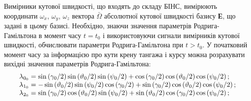 Вимірники кутової швидкості, що входять до складу БІНС, вимірюють координати 
$\omega_{x}$, $\omega_{y}$, $\omega_{z}$ вектора $\bar{\Omega }$ абсолютної кутової швидкості 
базису \textbf{Е}, що задані в цьому базисі. Необхідно, знаючи значення параметрів 
Родрига-Гамільтона в момент часу $t=t_{0} $ і використовуючи сигнали вимірників кутової 
швидкості, обчислювати параметри Родрига-Гамільтона при $t>t_{0} $. У початковий 
момент часу за інформацією про кути крену тангажа і курсу можна розрахувати вихідні 
значення параметрів Родрига-Гамільтона: 
\[\begin{array}{l} 
{\lambda_{0_{0}} =\sin  \left({\gamma_{0}  \mathord{
\left/{\vphantom{\gamma_{0}  2}}\right.\kern-\nulldelimiterspace} 2} \right)\sin 
 \left({\vartheta_{0}  \mathord{\left/{\vphantom{\vartheta_{0}  2}}\right.\kern-
\nulldelimiterspace} 2} \right)\sin  \left({\psi_{0}  \mathord{\left/{\vphantom{
\psi_{0}  2}}\right.\kern-\nulldelimiterspace} 2} \right)+\cos  \left({\gamma 
_{0}  \mathord{\left/{\vphantom{\gamma_{0}  2}}\right.\kern-\nulldelimiterspace} 
2} \right)\cos  \left({\vartheta_{0}  \mathord{\left/{\vphantom{\vartheta_{0}  
2}}\right.\kern-\nulldelimiterspace} 2} \right)\cos  \left({\psi_{0}  \mathord{
\left/{\vphantom{\psi_{0}  2}}\right.\kern-\nulldelimiterspace} 2} \right);} \\ 

{\lambda_{1_{0}} =-\sin  \left({\vartheta_{0}  \mathord{\left/{\vphantom{
\vartheta_{0}  2}}\right.\kern-\nulldelimiterspace} 2} \right)\sin  \left({\psi 
_{0}  \mathord{\left/{\vphantom{\psi_{0}  2}}\right.\kern-\nulldelimiterspace} 2} 
\right)\cos  \left({\gamma_{0}  \mathord{\left/{\vphantom{\gamma_{0}  2}}\right.
\kern-\nulldelimiterspace} 2} \right)+\sin \left({\gamma_{0}  \mathord{\left/{\vphantom{
\gamma_{0}  2}}\right.\kern-\nulldelimiterspace} 2} \right)\cos  \left({\vartheta 
_{0}  \mathord{\left/{\vphantom{\vartheta_{0}  2}}\right.\kern-\nulldelimiterspace} 
2} \right)\cos  \left({\psi_{0}  \mathord{\left/{\vphantom{\psi_{0}  2}}\right.
\kern-\nulldelimiterspace} 2} \right);} \\ 

{\lambda_{2_{0}} =\sin \left({
\gamma_{0}  \mathord{\left/{\vphantom{\gamma_{0}  2}}\right.\kern-\nulldelimiterspace} 
2} \right)\cos  \left({\vartheta_{0}  \mathord{\left/{\vphantom{\vartheta_{0}  
2}}\right.\kern-\nulldelimiterspace} 2} \right)\sin  \left({\psi_{0}  \mathord{
\left/{\vphantom{\psi_{0}  2}}\right.\kern-\nulldelimiterspace} 2} \right)+\sin 
 \left({\vartheta_{0}  \mathord{\left/{\vphantom{\vartheta_{0}  2}}\right.\kern-
\nulldelimiterspace} 2} \right)\cos  \left({\gamma_{0}  \mathord{\left/{\vphantom{
\gamma_{0}  2}}\right.\kern-\nulldelimiterspace} 2} \right)\cos  \left({\psi_{0}  
\mathord{\left/{\vphantom{\psi_{0}  2}}\right.\kern-\nulldelimiterspace} 2} \right);}\\ 


\end{array}\]

